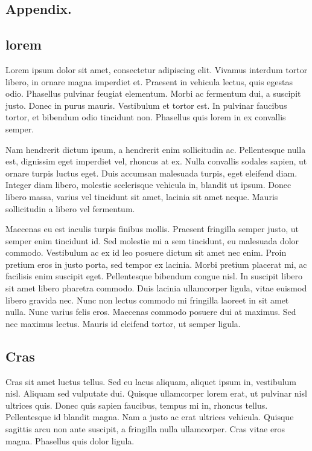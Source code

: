 \subsection{\label{ch:appendix:apx1} Appendix.}

\subsection{lorem}
Lorem ipsum dolor sit amet, consectetur adipiscing elit. Vivamus interdum tortor libero, in ornare magna imperdiet et. Praesent in vehicula lectus, quis egestas odio. Phasellus pulvinar feugiat elementum. Morbi ac fermentum dui, a suscipit justo. Donec in purus mauris. Vestibulum et tortor est. In pulvinar faucibus tortor, et bibendum odio tincidunt non. Phasellus quis lorem in ex convallis semper.

Nam hendrerit dictum ipsum, a hendrerit enim sollicitudin ac. Pellentesque nulla est, dignissim eget imperdiet vel, rhoncus at ex. Nulla convallis sodales sapien, ut ornare turpis luctus eget. Duis accumsan malesuada turpis, eget eleifend diam. Integer diam libero, molestie scelerisque vehicula in, blandit ut ipsum. Donec libero massa, varius vel tincidunt sit amet, lacinia sit amet neque. Mauris sollicitudin a libero vel fermentum.

Maecenas eu est iaculis turpis finibus mollis. Praesent fringilla semper justo, ut semper enim tincidunt id. Sed molestie mi a sem tincidunt, eu malesuada dolor commodo. Vestibulum ac ex id leo posuere dictum sit amet nec enim. Proin pretium eros in justo porta, sed tempor ex lacinia. Morbi pretium placerat mi, ac facilisis enim suscipit eget. Pellentesque bibendum congue nisl. In suscipit libero sit amet libero pharetra commodo. Duis lacinia ullamcorper ligula, vitae euismod libero gravida nec. Nunc non lectus commodo mi fringilla laoreet in sit amet nulla. Nunc varius felis eros. Maecenas commodo posuere dui at maximus. Sed nec maximus lectus. Mauris id eleifend tortor, ut semper ligula.

\subsection{Cras}
Cras sit amet luctus tellus. Sed eu lacus aliquam, aliquet ipsum in, vestibulum nisl. Aliquam sed vulputate dui. Quisque ullamcorper lorem erat, ut pulvinar nisl ultrices quis. Donec quis sapien faucibus, tempus mi in, rhoncus tellus. Pellentesque id blandit magna. Nam a justo ac erat ultrices vehicula. Quisque sagittis arcu non ante suscipit, a fringilla nulla ullamcorper. Cras vitae eros magna. Phasellus quis dolor ligula.

